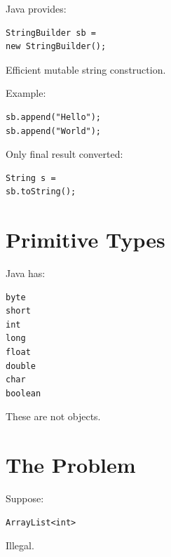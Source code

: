 \documentclass[11pt,a4paper]{book}
\begin{document}
Java provides:

\begin{verbatim}
StringBuilder sb =
new StringBuilder();
\end{verbatim}


Efficient mutable string construction.


Example:

\begin{verbatim}
sb.append("Hello");
sb.append("World");
\end{verbatim}


Only final result converted:

\begin{verbatim}
String s =
sb.toString();
\end{verbatim}


\section{Primitive Types}

Java has:

\begin{verbatim}
byte
short
int
long
float
double
char
boolean
\end{verbatim}


These are not objects.


\section{The Problem}

Suppose:

\begin{verbatim}
ArrayList<int>
\end{verbatim}


Illegal.

\end{document}
